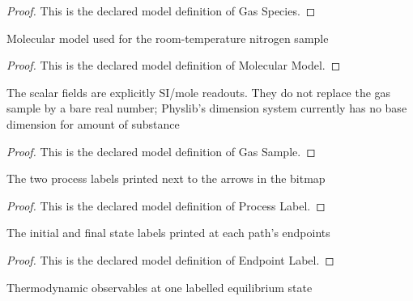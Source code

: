 \begin{proof}
  This is the declared model definition of Gas Species.
\end{proof}
\begin{definition}
  \label{def:physics:phyx-mini-0409:phyxminiproblems-problemphyxmini0409-molecularmodel}
  Molecular model used for the room-temperature nitrogen sample
\end{definition}
\begin{proof}
  This is the declared model definition of Molecular Model.
\end{proof}
\begin{definition}
  \label{def:physics:phyx-mini-0409:phyxminiproblems-problemphyxmini0409-gassample}
  The scalar fields are explicitly SI/mole readouts. They do not replace the gas sample by a bare real number; Physlib's dimension system currently has no base dimension for amount of substance
\end{definition}
\begin{proof}
  This is the declared model definition of Gas Sample.
\end{proof}
\begin{definition}
  \label{def:physics:phyx-mini-0409:phyxminiproblems-problemphyxmini0409-processlabel}
  The two process labels printed next to the arrows in the bitmap
\end{definition}
\begin{proof}
  This is the declared model definition of Process Label.
\end{proof}
\begin{definition}
  \label{def:physics:phyx-mini-0409:phyxminiproblems-problemphyxmini0409-endpointlabel}
  The initial and final state labels printed at each path's endpoints
\end{definition}
\begin{proof}
  This is the declared model definition of Endpoint Label.
\end{proof}
\begin{definition}
  \label{def:physics:phyx-mini-0409:phyxminiproblems-problemphyxmini0409-thermodynamicstate}
  Thermodynamic observables at one labelled equilibrium state
\end{definition}
